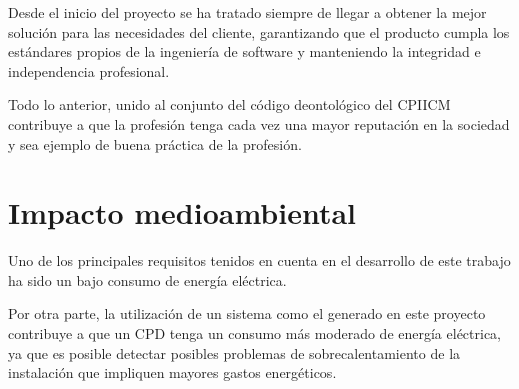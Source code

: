 Desde el inicio del proyecto se ha tratado siempre de llegar a obtener la mejor solución para las necesidades del cliente, garantizando que el producto cumpla los estándares propios de la ingeniería de software y manteniendo la integridad e independencia profesional.

Todo lo anterior, unido al conjunto del código deontológico del CPIICM~\cite{cpiicm_codigo_2012} contribuye a que la profesión tenga cada vez una mayor reputación en la sociedad y sea ejemplo de buena práctica de la profesión.

\section{Impacto medioambiental}\label{sec:impacto-medioambiental}
Uno de los principales requisitos tenidos en cuenta en el desarrollo de este trabajo ha sido un bajo consumo de energía eléctrica.

Por otra parte, la utilización de un sistema como el generado en este proyecto contribuye a que un CPD tenga un consumo más moderado de energía eléctrica, ya que es posible detectar posibles problemas de sobrecalentamiento de la instalación que impliquen mayores gastos energéticos.